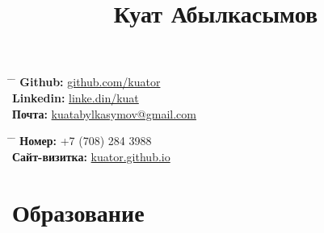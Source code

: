 \documentclass[10pt]{article} %
\begin{document}

\title{Куат Абылкасымов} %


\parbox{0.5\textwidth}{ %
\begin{tabbing} %
\hspace{3cm} \= \hspace{4cm} \= \kill %
{\bf Github:} \> \href{https://www.github.com/kuator}{github.com/kuator} \\ %
{\bf Linkedin:} \> \href{https://www.linkedin.com/in/kuat-abylkassymov-273bb2177/}{linke.din/kuat} \\ %
{\bf Почта: } \> \href{mailto:kuatabylkasymov@gmail.com}{kuatabylkasymov@gmail.com} \\ %
\end{tabbing}}
\hfill %
\parbox{0.5\textwidth}{ %
\begin{tabbing} %
\hspace{3cm} \= \hspace{4cm} \= \kill %
{\bf Номер: } \> +7 (708) 284 3988 \\ %
{\bf Сайт-визитка: } \> \href{https://kuator.github.io}{kuator.github.io} \\ %
\end{tabbing}}


\section{Образование}

\end{document}
